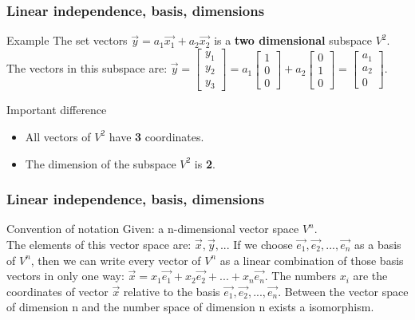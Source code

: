 \begin{frame}
	\frametitle{Linear independence, basis, dimensions}
	\begin{block}{Example}
		The set vectors $\overrightarrow{y}=a_1\overrightarrow{x_1}+a_2\overrightarrow{x_2}$ is a {\bf two dimensional} subspace $V^2$.\\
		The vectors in this subspace are: $\overrightarrow{y}=\begin{bmatrix} y_1\\y_2\\y_3\end{bmatrix}=a_1\begin{bmatrix} 1\\0\\0\end{bmatrix}+ a_2\begin{bmatrix} 0\\1\\0\end{bmatrix}=\begin{bmatrix} a_1\\a_2\\0\end{bmatrix}$.
	\end{block}
	\begin{block}{Important difference}
		\begin{itemize}
			\item All vectors of $V^2$ have \textbf{3} coordinates.
			\item The dimension of the subspace $V^2$ is \textbf{2}.
		\end{itemize}
	\end{block}
\end{frame}

\begin{frame}
	\frametitle{Linear independence, basis, dimensions}
	\begin{block}{Convention of notation}
		Given: a n-dimensional vector space $V^n$.\\
		The elements of this vector space are: $\overrightarrow{x},\overrightarrow{y},..$. If we choose $\overrightarrow{e_1},\overrightarrow{e_2},...,\overrightarrow{e_n}$ as a basis of $V^n$, then we can write every vector of $V^n$ as a linear combination of those basis vectors in only one way: $\overrightarrow{x}=x_1\overrightarrow{e_1}+x_2\overrightarrow{e_2}+ ...+x_n\overrightarrow{e_n}$. The numbers $x_i$ are the coordinates of vector $\overrightarrow{x}$ relative to the basis $\overrightarrow{e_1},\overrightarrow{e_2},..., \overrightarrow{e_n}$.\vspace{5mm}
		Between the vector space of dimension n and the number space of dimension n exists a isomorphism.	
	\end{block}
\end{frame}

